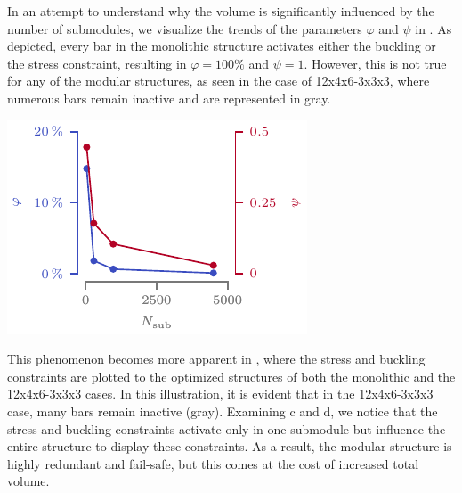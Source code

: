     In an attempt to understand why the volume is significantly influenced by the number of submodules, we visualize the trends of the parameters $\varphi$ and $\psi$ in . As depicted, every bar in the monolithic structure activates either the buckling or the stress constraint, resulting in $\varphi=100\%$ and $\psi=1$. However, this is not true for any of the modular structures, as seen in the case of 12x4x6-3x3x3, where numerous bars remain inactive and are represented in gray.
    \begin{marginfigure}
        \centering
        \includegraphics[width=\linewidth]{figures/05_cellular_opt/00_module_scale_tab/scale_tab_param.pdf}
        \caption{}
        \label{fig:05_scale_param}
    \end{marginfigure}
    This phenomenon becomes more apparent in , where the stress and buckling constraints are plotted to the optimized structures of both the monolithic and the 12x4x6-3x3x3 cases. In this illustration, it is evident that in the 12x4x6-3x3x3 case, many bars remain inactive (gray). Examining c and d, we notice that the stress and buckling constraints activate only in one submodule but influence the entire structure to display these constraints. As a result, the modular structure is highly redundant and fail-safe, but this comes at the cost of increased total volume.
